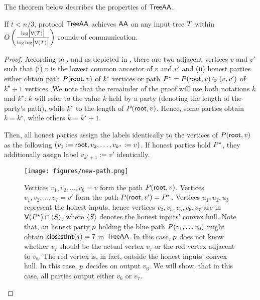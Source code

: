 The theorem below describes the properties of $\textsf{TreeAA}$.
\begin{theorem}
    If $t < n/3$, protocol $\textsf{TreeAA}$ achieves $\textsf{AA}$ on any input tree $T$ within $O \left(\frac{\log \abs{\vertices(\tree)}}{\log \log \abs{\vertices(\tree)}}\right)$ rounds of communication.
\end{theorem}

\begin{proof}
    According to , and as depicted in , there are two adjacent vertices $v$ and $v'$ such that (i) $v$ is the lowest common ancestor of $v$ and $v'$ and (ii) honest parties either obtain path $P(\textsf{root}, v)$ of $k^\star$ vertices or path $P^\star = P(\textsf{root}, v) \oplus (v, v')$ of $k^\star + 1$ vertices. We note that the remainder of the proof will use both notations $k$ and $k^\star$: $k$ will refer to the value $k$ held by a party (denoting the length of the party's path), while $k^{\star}$ to the length of $P(\textsf{root}, v)$. Hence, some parties obtain $k = k^\star$, while others $k = k^\star + 1$. 
    
    Then, all honest parties assign the labels identically to the vertices of \(P(\textsf{root}, v)\) as the following \((v_1 := \textsf{root}, v_2, \dots, v_{k^\star} := v)\). If honest parties hold \(P^\star\), they additionally assign label \(v_{k^\star + 1} := v'\) identically.
    
    \begin{figure}[h]
    \centering
    \texttt{[image: figures/new-path.png]}
    \caption{Vertices $v_1, v_2, \ldots, v_6 = v$ form the path $P(\textsf{root}, v)$.  Vertices $v_1, v_2, \ldots, v_7 = v'$ form the path $P(\textsf{root}, v') = P^\star$. Vertices $u_1, u_2, u_3$ represent the honest inputs,  hence vertices $v_3, v_5, v_5, v_6, v_7$ are in $\textsf{V}{(P^\star)} \cap \langle{S}\rangle$, where $\langle{S}\rangle$ denotes the honest inputs' convex hull.
    Note that, an honest party $p$ holding the blue path $P(v_1, \ldots v_6)$ might obtain $\textsf{closestInt}(j) = 7$ in $\textsf{TreeAA}$. In this case, $p$ does not know whether $v_7$ should be the actual vertex $v_7$ or the red vertex adjacent to $v_6$. The red vertex is, in fact, outside the honest inputs' convex hull. In this case, $p$ decides on output $v_6$. We will show, that in this case, all parties output either $v_6$ or $v_7$.
    }\label{figure:two-paths}
    \end{figure}



\end{proof}
